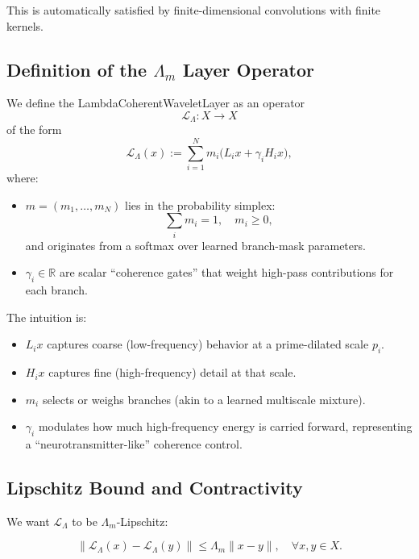 \documentclass[11pt]{article}
\begin{document}
This is automatically satisfied by finite-dimensional convolutions with finite kernels.

\subsection{Definition of the \texorpdfstring{$\Lambda_m$}{} Layer Operator}

We define the LambdaCoherentWaveletLayer as an operator
\[
  \mathcal{L}_\Lambda : X \to X
\]
of the form
\begin{equation}
  \mathcal{L}_\Lambda(x)
  := \sum_{i=1}^N m_i \bigl(L_i x + \gamma_i H_i x\bigr),
  \label{eq:LmbdaLayer}
\end{equation}
where:
\begin{itemize}
  \item $m = (m_1,\dots,m_N)$ lies in the probability simplex:
    \[
      \sum_i m_i = 1, \quad m_i \ge 0,
    \]
    and originates from a softmax over learned branch-mask parameters.
  \item $\gamma_i \in \mathbb{R}$ are scalar ``coherence gates'' that weight high-pass contributions for each branch.
\end{itemize}

The intuition is:
\begin{itemize}
  \item $L_i x$ captures coarse (low-frequency) behavior at a prime-dilated scale $p_i$.
  \item $H_i x$ captures fine (high-frequency) detail at that scale.
  \item $m_i$ selects or weighs branches (akin to a learned multiscale mixture).
  \item $\gamma_i$ modulates how much high-frequency energy is carried forward, representing a ``neurotransmitter-like'' coherence control.
\end{itemize}

\subsection{Lipschitz Bound and Contractivity}

We want $\mathcal{L}_\Lambda$ to be $\Lambda_m$-Lipschitz:

\begin{equation}
  \|\mathcal{L}_\Lambda(x) - \mathcal{L}_\Lambda(y)\|
  \le \Lambda_m \|x-y\|, \quad \forall x,y \in X.
  \label{eq:LipDef}
\end{equation}
\end{document}
